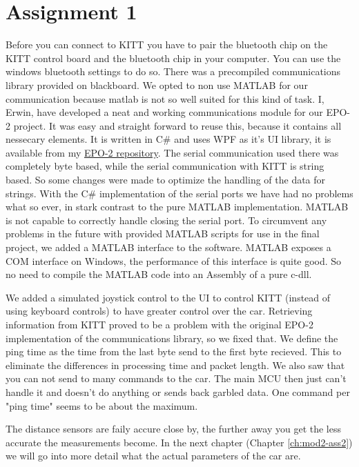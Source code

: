\documentclass[final]{scrreprt} %
\begin{document}
\chapter{Assignment 1}
\label{ch:mod2-ass1}
Before you can connect to KITT you have to pair the bluetooth chip on the KITT control board and the bluetooth chip in your computer.
You can use the windows bluetooth settings to do so.
There was a precompiled communications library provided on blackboard.
We opted to non use MATLAB for our communication because matlab is not so well suited for this kind of task.
I, Erwin, have developed a neat and working communications module for our EPO-2 project.
It was easy and straight forward to reuse this, because it contains all nessecary elements.
It is written in C\# and uses WPF as it's UI library, it is available from my \href{https://github.com/EraYaN/MiDeRP}{EPO-2 repository}.
The serial communication used there was completely byte based, while the serial communication with KITT is string based.
So some changes were made to optimize the handling of the data for strings.
With the C\# implementation of the serial ports we have had no problems what so ever, in stark contrast to the pure MATLAB implementation.
MATLAB is not capable to correctly handle closing the serial port.
To circumvent any problems in the future with provided MATLAB scripts for use in the final project, we added a MATLAB interface to the software.
MATLAB exposes a COM interface on Windows, the performance of this interface is quite good.
So no need to compile the MATLAB code into an Assembly of a pure c-dll.

We added a simulated joystick control to the UI to control KITT (instead of using keyboard controls) to have greater control over the car.
Retrieving information from KITT proved to be a problem with the original EPO-2 implementation of the communications library, so we fixed that.
We define the ping time as the time from the last byte send to the first byte recieved.
This to eliminate the differences in processing time and packet length.
We also saw that you can not send to many commands to the car.
The main MCU then just can't handle it and doesn't do anything or sends back garbled data.
One command per "ping time" seems to be about the maximum.

The distance sensors are faily accure close by, the further away you get the less accurate the measurements become.
In the next chapter (Chapter \ref{ch:mod2-ass2}) we will go into more detail what the actual parameters of the car are.
\end{document}
